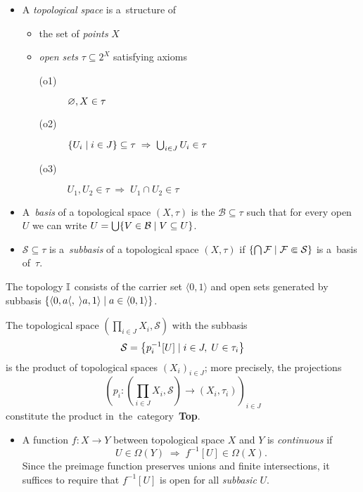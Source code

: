 \begin{itemize}
\item A \emph{topological space} is a~structure of
  \begin{itemize}
  \item the set of \emph{points\/} $X$
  \item \emph{open sets\/} $\tau\subseteq 2^X$ satisfying axioms
    \begin{description}
    \item[(o1)] $\varnothing, X \in \tau$
    \item[(o2)] $\left\{ U_i \mid i\in J \right\} \subseteq \tau \; \Rightarrow
    \; \bigcup_{i\in J} U_i \in \tau$
    \item[(o3)] $U_1, U_2 \in \tau \; \Rightarrow \; U_1 \cap U_2 \in \tau$
    \end{description}
  \end{itemize}

\item A~\emph{basis} of a topological space $(X, \tau)$ is the
$\mathcal{B}\subseteq \tau$ such that for every open $U$ we can write $U =
\bigcup \{V\in \mathcal{B} \mid V\subseteq U \}$.

\item $\mathcal{S}\subseteq \tau$ is a~\emph{subbasis} of a
topological space $(X, \tau)$ if $\left\{ \bigcap \mathcal{F} \mid \mathcal{F}
\Subset \mathcal{S} \right\}$ is a~basis of~$\tau$.
\end{itemize}

\begin{exmpl}
  The topology $\mathbb{I}$ consists of the carrier set $\langle 0, 1 \rangle$ and open
  sets generated by subbasis $\{ \langle 0, a \langle, \; \rangle a, 1 \rangle
  \mid a\in \langle 0, 1 \rangle \}$.
\end{exmpl}

\begin{exmpl}
  The topological space $\left( \prod_{i\in J} X_i, \mathcal{S} \right)$ with
  the subbasis
  \[
    \mathcal{S} = \left\{ p_{i}^{-1}[U] \mid i\in J, \; U\in \tau_i \right\}
  \]
  is the product of topological spaces $\left( X_i \right)_{i\in J}$;
  more precisely, the projections
  \[
    \left( p_i\colon \left(\prod_{i\in J} X_i, \mathcal{S}\right) \to
    \left(X_i, \tau_i\right) \right)_{i\in J}
  \]
  constitute the product in~the~category~{\bf Top}.
\end{exmpl}

\begin{itemize}
\item A function $f\colon X \to Y$ between topological space $X$ and $Y$ is
\emph{continuous} if 
\[
  U\in \Omega(Y) \; \Longrightarrow \; f^{-1}[U]\in \Omega(X).
\]
Since the preimage function preserves unions and finite intersections, it
suffices to require that $f^{-1}[U]$ is open for all \emph{subbasic\/} $U$.
\end{itemize}

